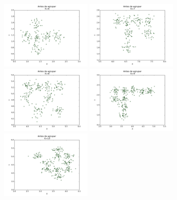 \documentclass[12pt, a4paper]{article}
\begin{document}
\begin{landscape}
\begin{figure}[!ht]
    \includegraphics[width=0.4\textwidth]{antes_k6.png}
    \includegraphics[width=0.4\textwidth]{antes_k7.png} 
    \includegraphics[width=0.4\textwidth]{antes_k8.png}    
    \includegraphics[width=0.4\textwidth]{antes_k9.png}
    \includegraphics[width=0.4\textwidth]{antes_k10.png}          
\end{figure}
\end{landscape}
\end{document}
